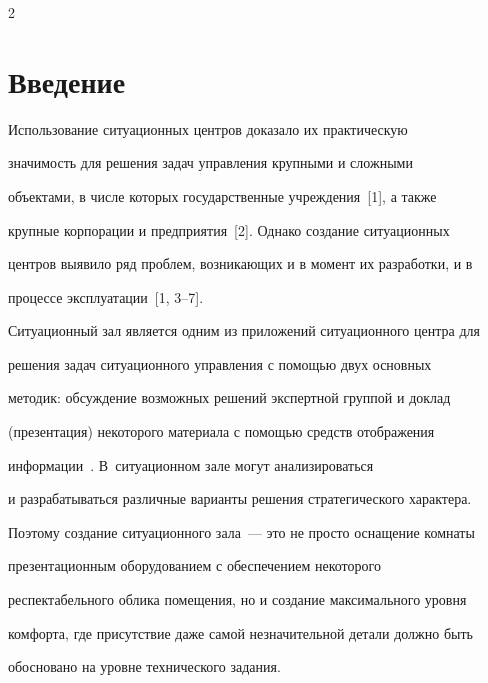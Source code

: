       \begin{multicols}{2}





      \label{st\stat}











\section{Введение}


    


    Использование ситуационных центров доказало их практическую 


значимость для решения задач управления крупными и сложными 


объектами, в числе которых государственные учреждения~[1], а также 


крупные корпорации и предприятия~[2]. Однако создание ситуационных 


центров выявило ряд проблем, возникающих и в момент их разработки, и в 


процессе эксплуатации~[1, 3--7].





Ситуационный зал является одним из приложений ситуационного центра для 


решения задач ситуационного управления с помощью двух основных 


методик: обсуждение возможных решений экспертной группой и доклад 


(презентация) некоторого материала с помощью средств отображения 


информации~\cite{8chu, 9chu}. В~ситуационном зале могут анализироваться 


и разрабатываться различные варианты решения стратегического характера. 


Поэтому создание ситуационного зала~--- это не просто оснащение комнаты 


презентационным оборудованием с обеспечением некоторого 


респектабельного облика помещения, но и создание максимального уровня 


комфорта, где присутствие даже самой незначительной детали должно быть 


обосновано на уровне технического задания.






\end{multicols}
